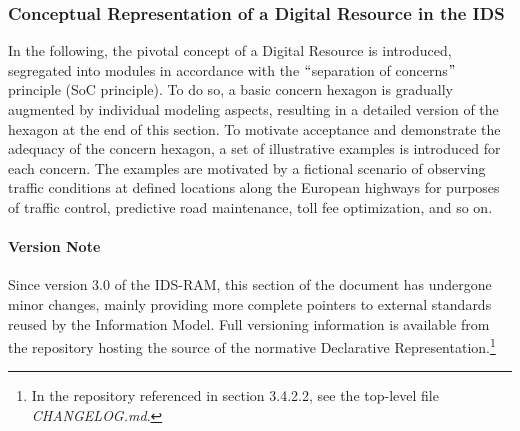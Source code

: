 

\subsubsection{Conceptual Representation of a Digital Resource in the IDS}
In the following, the pivotal concept of a Digital Resource is introduced, segregated into modules in accordance with the $``$separation of concerns$"$  principle (SoC principle). To do so, a basic concern hexagon is gradually augmented by individual modeling aspects, resulting in a detailed version of the hexagon at the end of this section. To motivate acceptance and demonstrate the adequacy of the concern hexagon, a set of illustrative examples is introduced for each concern. The examples are motivated by a fictional scenario of observing traffic conditions at defined locations along the European highways for purposes of traffic control, predictive road maintenance, toll fee optimization, and so on.


\paragraph{Version Note\\}
Since version 3.0 of the IDS-RAM, this section of the document has undergone minor changes, mainly providing more complete pointers to external standards reused by the Information Model.
Full versioning information is available from the repository hosting the source of the normative Declarative Representation.\footnote{In the repository referenced in section 3.4.2.2, see the top-level file \textit{CHANGELOG.md}.}


